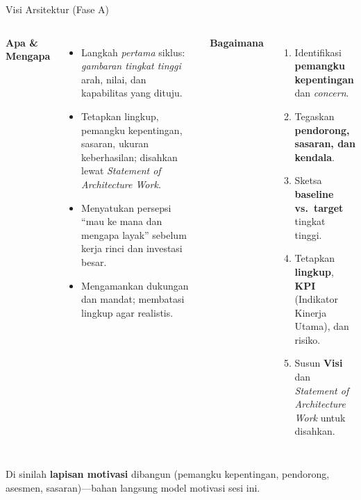 \documentclass[aspectratio=169, table]{beamer}
\newcommand{\takeaway}[1]{%
  \vspace{4pt}
  {\footnotesize #1}
}
\begin{document}
\begin{frame}{Visi Arsitektur (Fase A)}
  \vspace{2pt}
  \footnotesize
  \begin{columns}[t]
    \textbf{Apa \& Mengapa}
    \begin{itemize}\setlength{\itemsep}{2.5pt}
      \item Langkah \emph{pertama} siklus: \emph{gambaran tingkat tinggi} arah,
            nilai, dan kapabilitas yang dituju.
      \item Tetapkan lingkup, pemangku kepentingan, sasaran, ukuran
            keberhasilan; disahkan lewat \emph{Statement of Architecture Work}.
      \item Menyatukan persepsi ``mau ke mana dan mengapa layak'' sebelum
            kerja rinci dan investasi besar.
      \item Mengamankan dukungan dan mandat; membatasi lingkup agar realistis.
    \end{itemize}

    \textbf{Bagaimana}
    \begin{enumerate}\setlength{\itemsep}{2.5pt}
      \item Identifikasi \textbf{pemangku kepentingan} dan \emph{concern}.
      \item Tegaskan \textbf{pendorong, sasaran, dan kendala}.
      \item Sketsa \textbf{baseline vs.\ target} tingkat tinggi.
      \item Tetapkan \textbf{lingkup}, \textbf{KPI} (Indikator Kinerja Utama),
            dan risiko.
      \item Susun \textbf{Visi} dan \emph{Statement of Architecture Work} untuk
            disahkan.
    \end{enumerate}
  \end{columns}
  \vspace{2pt}
  \takeaway{Di sinilah \textbf{lapisan motivasi} dibangun (pemangku
  kepentingan, pendorong, asesmen, sasaran)---bahan langsung model motivasi
  sesi ini.}
\end{frame}
\end{document}
